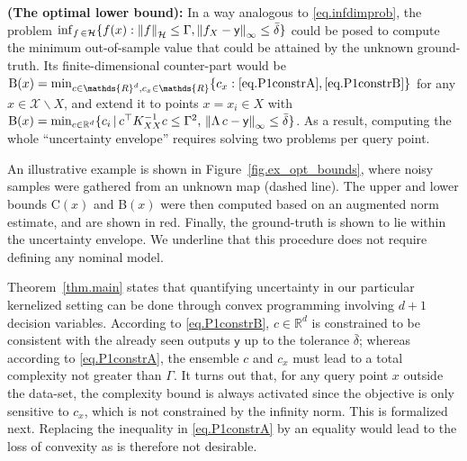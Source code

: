\begin{remark}
	\textbf{(The optimal lower bound):}
	In a way analogous to \eqref{eq.infdimprob}, the problem $\inf_{f \, \in \mathcal{H}} \{ f(x) : \left\| f \right\|_\mathcal{H} \leq \Gamma, \left\| f_X - \mathsf{y} \right\|_\infty \leq \bar \delta \} $ could be posed to compute the minimum out-of-sample value that could be attained by the unknown ground-truth. Its finite-dimensional counter-part would be ${\normalfont \text{B}(x)} = \min_{c \in \mathds{R}^d, c_x \in \mathds{R}}  \{c_x : \eqref{eq.P1constrA}, \eqref{eq.P1constrB}\}$ for any $x \in \mathcal{X} \backslash X$, and extend it to points $x = x_i \in X$ with $\text{B}(x) = \min_{c \in \mathbb{R}^d} \{c_i \, | \, c^\top K_{XX}^{-1}c \leq \Gamma^2, \, \left\| \Lambda \, c - \mathsf{y} \right\|_\infty \leq \bar \delta \}$. As a result, computing the whole  ``uncertainty envelope'' requires solving two problems per query point.
\end{remark}

An illustrative example is shown in Figure~\ref{fig.ex_opt_bounds}, where noisy samples were gathered from an unknown map (dashed line). The upper and lower bounds C$(x)$ and B$(x)$ were then computed based on an augmented norm estimate, and are shown in red. Finally, the ground-truth is shown to lie within the uncertainty envelope. We underline that this procedure does not require defining any nominal model.

Theorem~\ref{thm.main} states that quantifying uncertainty in our particular kernelized setting can be done through convex programming involving $d+1$ decision variables. According to \eqref{eq.P1constrB}, $c \in \mathbb{R}^d$ is constrained to be consistent with the already seen outputs $\mathsf{y}$ up to the tolerance $\bar\delta$; whereas according to \eqref{eq.P1constrA}, the ensemble $c$ and $c_x$ must lead to a total complexity not greater than $\Gamma$. It turns out that, for any query point $x$ outside the data-set, the complexity bound is always activated since the objective is only sensitive to $c_x$, which is not constrained by the infinity norm. This is formalized next. Replacing the inequality in \eqref{eq.P1constrA} by an equality would lead to the loss of convexity as is therefore not desirable.

